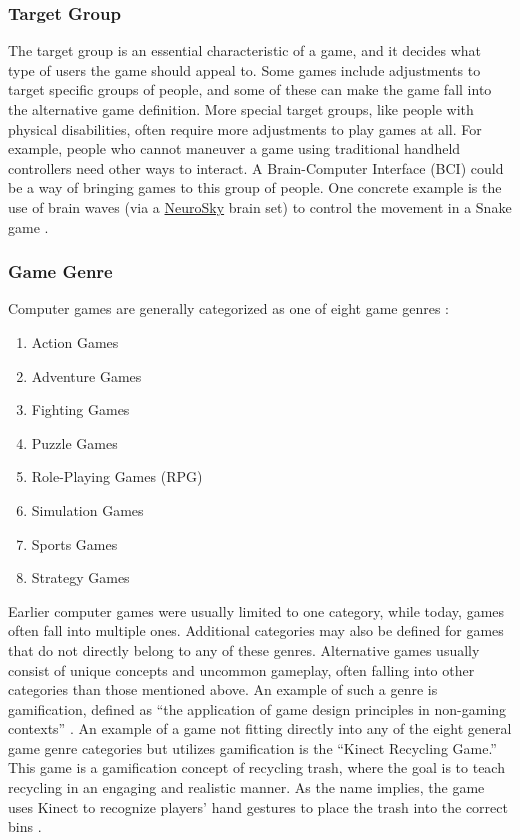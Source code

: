 \subsubsection{Target Group}
The target group is an essential characteristic of a game, and it decides what type of users the game should appeal to. Some games include adjustments to target specific groups of people, and some of these can make the game fall into the alternative game definition. More special target groups, like people with physical disabilities, often require more adjustments to play games at all. For example, people who cannot maneuver a game using traditional handheld controllers need other ways to interact. A Brain-Computer Interface (BCI) could be a way of bringing games to this group of people. One concrete example is the use of brain waves (via a \href{www.neurosky.com}{NeuroSky} brain set) to control the movement in a Snake game \citep{wang_using_2012}.

\subsubsection{Game Genre}
Computer games are generally categorized as one of eight game genres \citep{prensky_fun_2001}:

\begin{enumerate}
    \item Action Games
    \item Adventure Games
    \item Fighting Games
    \item Puzzle Games
    \item Role-Playing Games (RPG)
    \item Simulation Games
    \item Sports Games
    \item Strategy Games
\end{enumerate}

Earlier computer games were usually limited to one category, while today, games often fall into multiple ones. Additional categories may also be defined for games that do not directly belong to any of these genres. Alternative games usually consist of unique concepts and uncommon gameplay, often falling into other categories than those mentioned above. An example of such a genre is gamification, defined as “the application of game design principles in non-gaming contexts” \cite{robson_is_2015}. An example of a game not fitting directly into any of the eight general game genre categories but utilizes gamification is the “Kinect Recycling Game.” This game is a gamification concept of recycling trash, where the goal is to teach recycling in an engaging and realistic manner. As the name implies, the game uses Kinect to recognize players' hand gestures to place the trash into the correct bins \citep{wang_learning_2015}.

